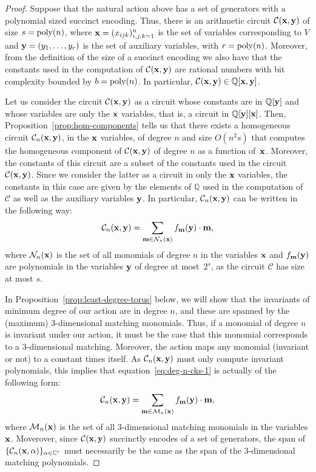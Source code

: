 \documentclass[10pt,a4paper]{article}
\newcommand{\C}{\mathbb C}
\newcommand{\Q}{\mathbb Q}
\newcommand{\cC}{\mathcal C}
\newcommand{\cN}{\mathcal N}
\newcommand{\cM}{\mathcal M}
\newcommand{\bbm}{\textbf m}
\newcommand{\bx}{\textbf x}
\newcommand{\by}{\textbf y}
\begin{document}
\begin{proof}
	Suppose that the natural action above has a set of generators with
	a polynomial sized succinct encoding. Thus, there is an arithmetic
	circuit $\cC(\bx, \by)$ of size $s = {\rm poly}(n)$, where
	$\bx = (x_{ijk})_{i,j,k=1}^n$ is the set of variables corresponding
	to $V$ and $\by = (y_1, \ldots, y_r)$ is the set of auxiliary
	variables, with $r = {\rm poly}(n)$.
	Moreover, from the definition of the size of a succinct encoding we also have that the
	constants used in the computation of $\cC(\bx, \by)$ are rational numbers with bit
	complexity bounded by $b = {\rm poly}(n)$. In particular, $\cC(\bx, \by) \in \Q[\bx,\by]$.

	Let us consider the circuit $\cC(\bx, \by)$ as a circuit whose constants
	are in $\Q[\by]$ and whose variables are only the $\bx$ variables,
	that is, a circuit in $\Q[\by][\bx]$.
  Then, Proposition~\ref{prop:hom-components}
	tells us that there exists a homogeneous circuit $\cC_n(\bx, \by)$,
	in the $\bx$ variables, of degree $n$ and size $O(n^2 s)$ that computes the homogeneous component of $\cC(\bx,\by)$ of degree $n$ as a function of~$\bx$.
  Moreover, the constants of this circuit are a subset of the constants used in the circuit $\cC(\bx, \by)$.
  Since we consider the latter as a circuit in only the $\bx$ variables, the constants in this case are given by the elements of $\Q$ used in the computation of
  $\cC$ as well as the auxiliary variables $\by$.
  In particular, $\cC_n(\bx, \by)$ can be written in the following way:
	\begin{equation}\label{eq:deg-n-cks-1}
		\cC_n(\bx, \by) = \sum_{\bbm \in \cN_n(\bx)} f_\bbm(\by) \cdot \bbm,
	\end{equation}
	where $\cN_n(\bx)$ is the set of all monomials of degree $n$ in the
	variables $\bx$ and $f_\bbm(\by)$ are polynomials in the variables $\by$ of
	degree at most~$2^s$, as the circuit $\cC$ has size at most $s$.

	In Proposition~\ref{prop:least-degree-torus} below, we will show that the invariants
	of minimum degree of our action are in degree $n$, and these
	are spanned by the (maximum) $3$-dimensional matching monomials.
  Thus, if a monomial of degree $n$ is invariant under our action, it must be the case that this monomial corresponds to a $3$-dimensional matching.
  Moreover, the action maps any monomial (invariant or not) to a constant times itself. 
  As $\cC_n(\bx, \by)$ must only compute invariant polynomials, this
	implies that equation~\eqref{eq:deg-n-cks-1} is actually of the following form:
	\begin{equation}\label{eq:deg-n-cks-2}
		\cC_n(\bx, \by) = \sum_{\bbm \in \cM_n(\bx)}
		f_\bbm(\by) \cdot \bbm,
	\end{equation}
	where $\cM_n(\bx)$ is the set of all $3$-dimensional matching monomials
	in the variables $\bx$.
  Moverover, since $\cC(\bx,\by)$ succinctly encodes of a set of generators, the span of $\{\cC_n(\bx,\alpha)\}_{\alpha\in\C^r}$ must necessarily be the same as the span of the 3-dimensional matching polynomials.


\end{proof}
\end{document}
